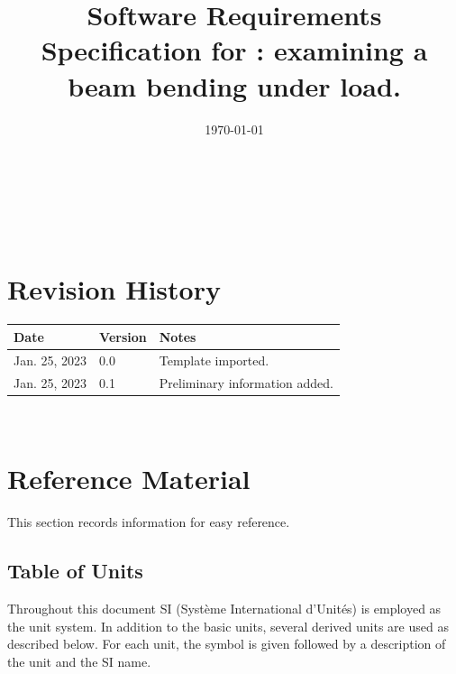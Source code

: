 \documentclass[12pt]{article}
\begin{document}
\title{Software Requirements Specification for \progname: examining a beam bending under load.}
\author{\authname}
\date{\today}

\maketitle

~\newpage


\tableofcontents

~\newpage

\section*{Revision History}

\begin{tabularx}{\textwidth}{p{3cm}p{2cm}X}
    \toprule {\bf Date} & {\bf Version} & {\bf Notes}        \\
    \midrule
    Jan. 25, 2023       & 0.0           & Template imported. \\
    Jan. 25, 2023       & 0.1           & Preliminary information added. \\
    \bottomrule
\end{tabularx}

~\newpage

\section{Reference Material}

This section records information for easy reference.

\subsection{Table of Units}

Throughout this document SI (Syst\`{e}me International d'Unit\'{e}s) is employed
as the unit system.  In addition to the basic units, several derived units are
used as described below.  For each unit, the symbol is given followed by a
description of the unit and the SI name.
~\newline
\end{document}
